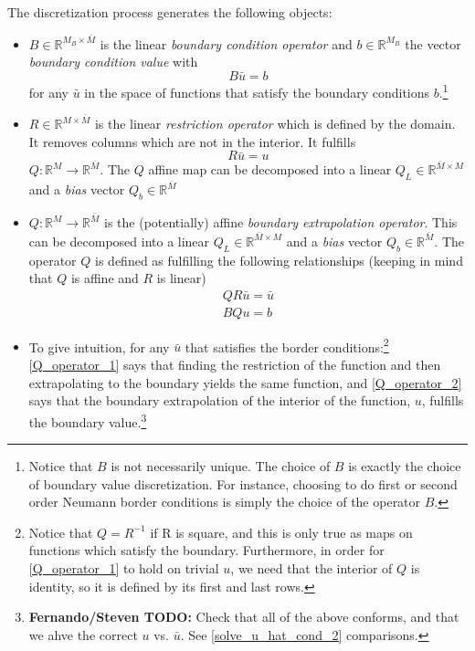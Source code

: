 \documentclass[11pt]{article}
\newcommand{\R}{\ensuremath{\mathbb{R}}}
\begin{document}
	The discretization process generates the following objects:
	\begin{itemize}
		\item $B\in \R^{M_B \times \bar{M}}$ is the linear \textit{boundary condition operator} and $b \in \R^{M_B}$ the vector \textit{boundary condition value} with
		\begin{equation}
		B \bar{u} = b
		\label{B_operator_block}
		\end{equation}
		for any $\bar{u}$ in the space of functions that satisfy the boundary conditions $b$.\footnote{
Notice that $B$ is not necessarily unique. The choice of $B$ is exactly the choice of boundary value discretization. For instance, choosing to do first or second order Neumann border conditions is simply the choice of the operator $B$.}
		\item $R\in \R^{M\times \bar{M}}$ is the linear \textit{restriction operator} which is defined by the domain. It removes columns which are not in the interior. It fulfills
		\begin{equation}
		R \bar{u} = u \label{R_operator}
		\end{equation}
$Q : \R^M \to \R^{\bar{M}}$.  The $Q$ affine map can be decomposed into a linear $Q_L \in \R^{\bar{M}\times M}$ and a \textit{bias} vector $Q_b \in \R^{\bar{M}}$
		\item $Q : \R^M \to \R^{\bar{M}}$ is the (potentially) affine \textit{boundary extrapolation operator}.  This can be decomposed into a linear $Q_L \in \R^{\bar{M}\times M}$ and a \textit{bias} vector $Q_b \in \R^{\bar{M}}$.  The operator $Q$ is defined as fulfilling the following relationships (keeping in mind that $Q$ is affine and $R$ is linear)
		\begin{align}
		Q  R\bar{u} = \bar{u}\label{Q_operator_1}\\
		B Q u  = b	\label{Q_operator_2}
	\end{align}
	\item To give intuition, for any $\bar{u}$ that satisfies the border conditions:\footnote{Notice that $Q = R^{-1}$ if R is square, and this is only true as maps on functions which satisfy the boundary.  Furthermore, in order for \cref{Q_operator_1} to hold on trivial $u$, we need that the interior of $Q$ is identity, so it is defined by its first and last rows.} \cref{Q_operator_1} says that finding the restriction of the function and then extrapolating to the boundary yields the same function, and \cref{Q_operator_2} says that the boundary extrapolation of the interior of the function, $u$, fulfills the boundary value.\footnote{
		\textbf{Fernando/Steven TODO:} Check that all of the above conforms, and that we ahve the correct $u$ vs. $\bar{u}$.  See \cref{solve_u_hat_cond_2} comparisons.}
		\end{itemize}
\end{document}
